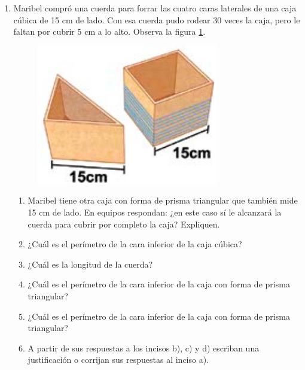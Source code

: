 \documentclass[11pt]{book}
\begin{document}
\begin{enumerate}
  \item Maribel compró una cuerda para forrar las cuatro caras laterales de una caja cúbica de 15 cm de lado.
        Con esa cuerda pudo rodear 30 veces la caja, pero le faltan
        por cubrir 5 cm a lo alto. Observa la figura \ref{fig:boxes}.

        \begin{minipage}{0.25\textwidth}
          \begin{figure}[H]
            \centering
            \includegraphics[width=\linewidth]{boxes.png}
            \label{fig:boxes}
          \end{figure}
        \end{minipage}\hfill
        \begin{minipage}{0.65\textwidth}
          \begin{enumerate}
            \item Maribel tiene otra caja con forma de prisma triangular que también mide
                  15 cm de lado. En equipos respondan: ¿en este caso sí le alcanzará la
                  cuerda para cubrir por completo la caja? Expliquen.
            \item ¿Cuál es el perímetro de la cara inferior de la caja cúbica?
            \item ¿Cuál es la longitud de la cuerda?
            \item ¿Cuál es el perímetro de la cara inferior de la caja con forma de prisma triangular?
            \item ¿Cuál es el perímetro de la cara inferior de la caja con forma de prisma triangular?
            \item A partir de sus respuestas a los incisos b), c) y d) escriban una justificación o corrijan
                  sus respuestas al inciso a).
          \end{enumerate}
        \end{minipage}


\end{enumerate}
\end{document}
